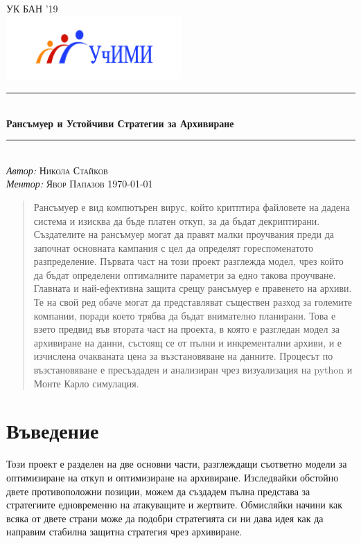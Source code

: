 \documentclass[11pt, a4paper]{article}
\theoremstyle{definition}
\begin{document}
\begin{titlepage}
	\newcommand{\HRule}{\rule{\linewidth}{0.5mm}}
	\centering
	\textsc{\LARGE УК БАН '19}\\
	\includegraphics[width=0.5\textwidth]{Uchimi_logo}\\
	\HRule\\[1 cm]
	{\huge\bfseries Рансъмуер и Устойчиви Стратегии за Архивиране}\\[1 cm]
	\HRule\\
	\vfill
			\Large
			\textit{Автор:}
			 \textsc{Никола Стайков}\\
             \vspace{2cm}
			\Large
			\textit{Ментор:}
            \textsc{Явор Папазов}
    \vfill	
	{\large\today}   
	\vfill
\end{titlepage}

\tableofcontents
\newpage
\begin{abstract}
		Рансъмуер е вид компютърен вирус, който критптира файловете на дадена система и изисква да бъде платен откуп, за да бъдат декриптирани. Създателите на рансъмуер могат да правят малки проучвания преди да започнат основната кампания с цел да определят гореспоменатото разпределение. Първата част на този проект разглежда модел, чрез който да бъдат определени оптималните параметри за едно такова проучване. Главната и най-ефективна защита срещу рансъмуер е правенето на архиви. Те на свой ред обаче могат да представляват съществен разход за големите компании, поради което трябва да бъдат внимателно планирани. Това е взето предвид във втората част на проекта, в която е разгледан модел за архивиране на данни, състоящ се от пълни и инкрементални архиви, и е изчислена очакваната цена за възстановяване на данните. Процесът по възстановяване е пресъздаден и анализиран чрез визуализация на python и Монте Карло симулация.
\end{abstract}

\section{Въведение}
		Този проект е разделен на две основни части, разглеждащи съответно модели за оптимизиране на откуп и оптимизиране на архивиране. Изследвайки обстойно двете противоположни позиции, можем да създадем пълна представа за стратегиите едновременно на атакуващите и жертвите. Обмисляйки начини как всяка от двете страни може да подобри стратегията си ни дава идея как да направим стабилна защитна стратегия чрез архивиране.
\end{document}
